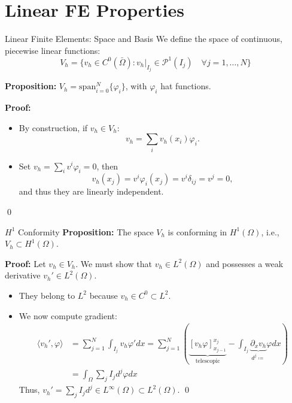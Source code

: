 \documentclass[aspectratio=169]{beamer}
\begin{document}
\section{Linear FE Properties}

\begin{frame}{Linear Finite Elements: Space and Basis}
    We define the space of continuous, piecewise linear functions:
    $$ V_h = \{ v_h \in C^0(\bar{\Omega}) : v_h|_{I_j} \in \mathcal{P}^1(I_j) \quad \forall j=1,\dots,N \} $$

    \textbf{Proposition:} $V_h = \text{span}_{i=0}^N\{\varphi_i\}$, with $\varphi_i$ hat functions.

    \textbf{Proof:}\pause
    \begin{itemize}[<+->]
        \item By construction, if $v_h\in V_h$: 
            $$ v_h = \sum_i v_h(x_i) \varphi_i. $$
        \item Set $v_h = \sum_i v^i \varphi_i = 0$, then
                $$ v_h(x_j) = v^i \varphi_i(x_j) = v^i \delta_{ij} = v^j = 0, $$
                and thus they are linearly independent.
    \end{itemize}
    \qed
\end{frame}

\begin{frame}{$H^1$ Conformity}
    \textbf{Proposition:} The space $V_h$ is conforming in $H^1(\Omega)$, i.e., $V_h \subset H^1(\Omega)$.

    \textbf{Proof:}
    Let $v_h \in V_h$. We must show that $v_h \in L^2(\Omega)$ and possesses a weak derivative $v_h' \in L^2(\Omega)$.
    \begin{itemize}
        \item They belong to $L^2$ because $v_h\in C^0\subset L^2$.
        \item We now compute gradient: 
        \begin{align*}
            \langle v_h', \varphi\rangle &= \sum_{j=1}^N \int_{I_j} v_h \varphi' dx = \sum_{j=1}^N \left( \underbrace{[v_h \varphi]_{x_{j-1}}^{x_j}}_\text{telescopic} - \int_{I_j} \underbrace{\partial_x v_h}_{d^j \coloneqq} \varphi dx \right) \tag{Integration by parts on $I_j$} \\
            &= \int_\Omega \sum_j I_j d^j \varphi dx
        \end{align*}
        Thus, $v_h' = \sum_j I_j d^j\in L^\infty(\Omega)\subset L^2(\Omega)$. \qed
    \end{itemize}
\end{frame}
\end{document}
